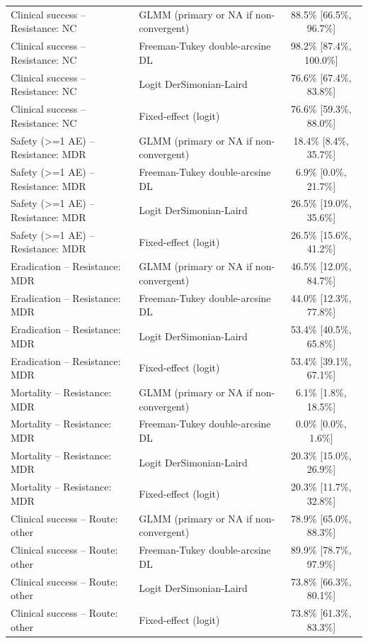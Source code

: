 \begin{tabular}{llc}
Clinical success -- Resistance: NC & GLMM (primary or NA if non-convergent) & 88.5\% [66.5\%, 96.7\%] \\
Clinical success -- Resistance: NC & Freeman-Tukey double-arcsine DL & 98.2\% [87.4\%, 100.0\%] \\
Clinical success -- Resistance: NC & Logit DerSimonian-Laird & 76.6\% [67.4\%, 83.8\%] \\
Clinical success -- Resistance: NC & Fixed-effect (logit) & 76.6\% [59.3\%, 88.0\%] \\
Safety (>=1 AE) -- Resistance: MDR & GLMM (primary or NA if non-convergent) & 18.4\% [8.4\%, 35.7\%] \\
Safety (>=1 AE) -- Resistance: MDR & Freeman-Tukey double-arcsine DL & 6.9\% [0.0\%, 21.7\%] \\
Safety (>=1 AE) -- Resistance: MDR & Logit DerSimonian-Laird & 26.5\% [19.0\%, 35.6\%] \\
Safety (>=1 AE) -- Resistance: MDR & Fixed-effect (logit) & 26.5\% [15.6\%, 41.2\%] \\
Eradication -- Resistance: MDR & GLMM (primary or NA if non-convergent) & 46.5\% [12.0\%, 84.7\%] \\
Eradication -- Resistance: MDR & Freeman-Tukey double-arcsine DL & 44.0\% [12.3\%, 77.8\%] \\
Eradication -- Resistance: MDR & Logit DerSimonian-Laird & 53.4\% [40.5\%, 65.8\%] \\
Eradication -- Resistance: MDR & Fixed-effect (logit) & 53.4\% [39.1\%, 67.1\%] \\
Mortality -- Resistance: MDR & GLMM (primary or NA if non-convergent) & 6.1\% [1.8\%, 18.5\%] \\
Mortality -- Resistance: MDR & Freeman-Tukey double-arcsine DL & 0.0\% [0.0\%, 1.6\%] \\
Mortality -- Resistance: MDR & Logit DerSimonian-Laird & 20.3\% [15.0\%, 26.9\%] \\
Mortality -- Resistance: MDR & Fixed-effect (logit) & 20.3\% [11.7\%, 32.8\%] \\
Clinical success -- Route: other & GLMM (primary or NA if non-convergent) & 78.9\% [65.0\%, 88.3\%] \\
Clinical success -- Route: other & Freeman-Tukey double-arcsine DL & 89.9\% [78.7\%, 97.9\%] \\
Clinical success -- Route: other & Logit DerSimonian-Laird & 73.8\% [66.3\%, 80.1\%] \\
Clinical success -- Route: other & Fixed-effect (logit) & 73.8\% [61.3\%, 83.3\%] \\

\end{tabular}
